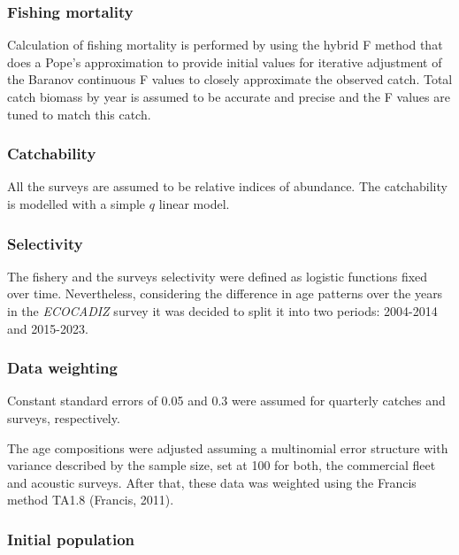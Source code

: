 \documentclass[
]{article}
\begin{document}
\hypertarget{fishing-mortality}{%
\subsubsection{Fishing mortality}\label{fishing-mortality}}

Calculation of fishing mortality is performed by using the hybrid F
method that does a Pope's approximation to provide initial values for
iterative adjustment of the Baranov continuous F values to closely
approximate the observed catch. Total catch biomass by year is assumed
to be accurate and precise and the F values are tuned to match this
catch.

\hypertarget{catchability}{%
\subsubsection{Catchability}\label{catchability}}

All the surveys are assumed to be relative indices of abundance. The
catchability is modelled with a simple \(q\) linear model.

\hypertarget{selectivity}{%
\subsubsection{Selectivity}\label{selectivity}}

The fishery and the surveys selectivity were defined as logistic
functions fixed over time. Nevertheless, considering the difference in
age patterns over the years in the \emph{ECOCADIZ} survey it was decided
to split it into two periods: 2004-2014 and 2015-2023.

\hypertarget{data-weighting}{%
\subsubsection{Data weighting}\label{data-weighting}}

Constant standard errors of 0.05 and 0.3 were assumed for quarterly
catches and surveys, respectively.

The age compositions were adjusted assuming a multinomial error
structure with variance described by the sample size, set at 100 for
both, the commercial fleet and acoustic surveys. After that, these data
was weighted using the Francis method TA1.8 (Francis, 2011).

\hypertarget{initial-population}{%
\subsubsection{Initial population}\label{initial-population}}
\end{document}
